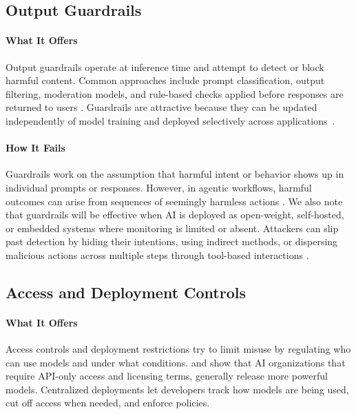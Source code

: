 \documentclass{article}
\theoremstyle{plain}
\theoremstyle{definition}
\theoremstyle{remark}
\begin{document}
\subsection{Output Guardrails}

\paragraph{What It Offers}
Output guardrails operate at inference time and attempt to detect or block harmful content. Common approaches include prompt classification, output filtering, moderation models, and rule-based checks applied before responses are returned to users \citep{ayyamperumal2024current}. Guardrails are attractive because they can be updated independently of model training and deployed selectively across applications~\citep{dong2024position}.

\paragraph{How It Fails}
Guardrails work on the assumption that harmful intent or behavior shows up in individual prompts or responses. However, in agentic workflows, harmful outcomes can arise from sequences of seemingly harmless actions \citep{gu2024agent,kumar2024refusal}. We also note that guardrails will be effective when AI is deployed as open-weight, self-hosted, or embedded systems where monitoring is limited or absent. Attackers can slip past detection by hiding their intentions, using indirect methods, or dispersing malicious actions across multiple steps through tool-based interactions \citep{jin2024jailbreaking,villa2025exposing}.


\subsection{Access and Deployment Controls}

\paragraph{What It Offers}
Access controls and deployment restrictions try to limit misuse by regulating who can use models and under what conditions. \citet{aisi_openweight} and \citet{eiras2024position} show that AI organizations that require API-only access and licensing terms, generally release more powerful models. Centralized deployments let developers track how models are being used, cut off access when needed, and enforce policies.
\end{document}
